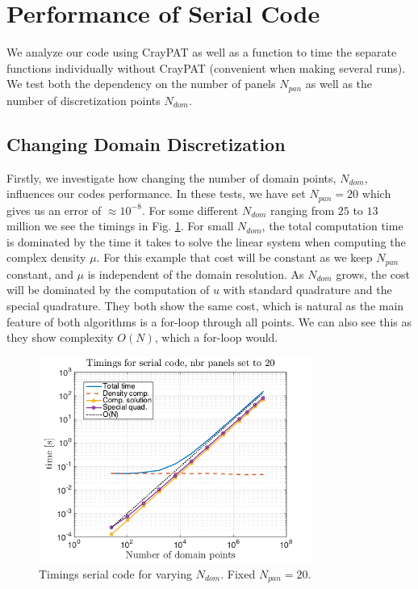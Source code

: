 \documentclass[a4paper,10pt]{article}
\begin{document}
\section*{Performance of Serial Code}
We analyze our code using CrayPAT as well as a function to time the separate functions individually without CrayPAT (convenient when making several runs). We test both the dependency on the number of panels $N_{pan}$ as well as the number of discretization points $N_{dom}$.

\subsection*{Changing Domain Discretization}
Firstly, we investigate how changing the number of domain points, $N_{dom}$, influences our codes performance. In these tests, we have set $N_{pan}=20$ which gives us an error of $\approx 10^{-8}$. For some different $N_{dom}$ ranging from $25$ to $13$ million we see the timings in Fig. \ref{fig:serial1}. For small $N_{dom}$, the total computation time is dominated by the time it takes to solve the linear system when computing the complex density $\mu$. For this example that cost will be constant as we keep $N_{pan}$ constant, and $\mu$ is independent of the domain resolution. As $N_{dom}$ grows, the cost will be dominated by the computation of $u$ with standard quadrature and the special quadrature. They both show the same cost, which is natural as the main feature of both algorithms is a for-loop through all points. We can also see this as they show complexity $O(N)$, which a for-loop would. 
\begin{figure}[ht]
    \begin{center}
        \includegraphics[width=0.8\textwidth]{Graphics/timing_serial_npanels20.png}
    \end{center}
    \caption{Timings serial code for varying $N_{dom}$. Fixed $N_{pan}=20$.}
    \label{fig:serial1}
\end{figure}
\end{document}
